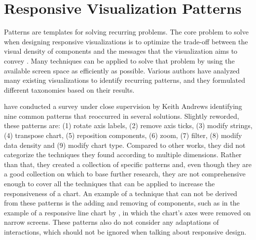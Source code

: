 \section{Responsive Visualization Patterns}

Patterns are templates for solving recurring problems. The core problem to solve when designing responsive visualizations is to optimize the trade-off between the visual density of components and the messages that the visualization aims to convey \parencite{DesignPatternsTradeOffsRespVis}. Many techniques can be applied to solve that problem by using the available screen space as efficiently as possible. Various authors have analyzed many existing visualizations to identify recurring patterns, and they formulated different taxonomies based on their results.

\cite{RespVisSurvey} have conducted a survey under close supervision by Keith Andrews \parencite{RespVis} identifying nine common patterns that reoccurred in several solutions. Slightly reworded, these patterns are: (1) rotate axis labels, (2) remove axis ticks, (3) modify strings, (4) transpose chart, (5) reposition components, (6) zoom, (7) filter, (8) modify data density and (9) modify chart type. Compared to other works, they did not categorize the techniques they found according to multiple dimensions. Rather than that, they created a collection of specific patterns and, even though they are a good collection on which to base further research, they are not comprehensive enough to cover all the techniques that can be applied to increase the responsiveness of a chart. An example of a technique that can not be derived from these patterns is the adding and removing of components, such as in the example of a responsive line chart by \cite{RespVis}, in which the chart's axes were removed on narrow screens. These patterns also do not consider any adaptations of interactions, which should not be ignored when talking about responsive design.

